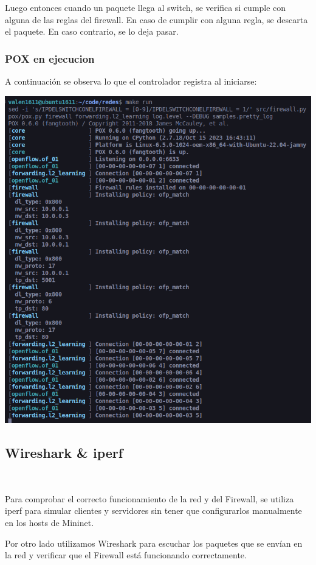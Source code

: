 \documentclass{article}
\begin{document}
Luego entonces cuando un paquete llega al switch, se verifica si cumple con alguna de las reglas del firewall. En caso de cumplir con alguna regla, se descarta el paquete. En caso contrario, se lo deja pasar. 

\subsubsection{POX en ejecucion}

A continuación se observa lo que el controlador registra al iniciarse:
\begin{center}
 \includegraphics[scale=0.45]{pox_init.png}
\end{center}


\subsection{Wireshark \& iperf}\label{wireshark-iperf} \


Para comprobar el correcto funcionamiento de la red y del Firewall, se utiliza iperf para simular clientes y servidores sin tener que configurarlos manualmente en los hosts de Mininet. 

Por otro lado utilizamos Wireshark para escuchar los paquetes que se envían en la red y verificar que el Firewall está funcionando correctamente.
\end{document}
